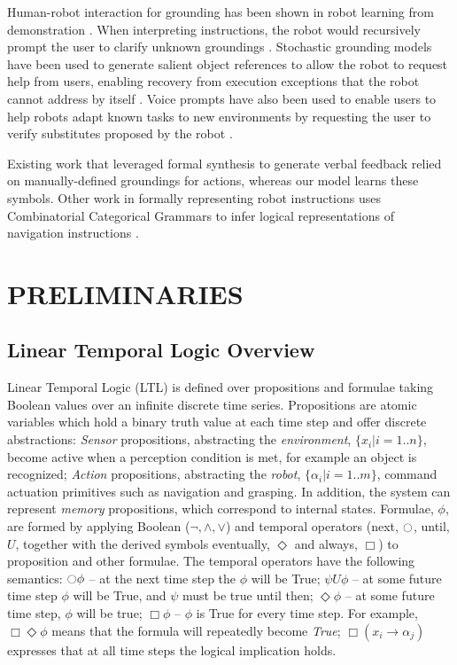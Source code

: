 \documentclass[letterpaper]{article} %
\begin{document}
Human-robot interaction for grounding has been shown in robot learning from demonstration \cite{argall2009survey}. When interpreting instructions, the robot would recursively prompt the user to clarify unknown groundings \cite{lauriar2001training,chao2011towards}. 
Stochastic grounding models have been used to generate salient object references to allow the robot to request help from users, enabling recovery from execution exceptions that the robot cannot address by itself \cite{tellex2014asking}. 
Voice prompts have also been used to enable users to help robots adapt known tasks to new environments by requesting the user to verify substitutes proposed by the robot \cite{boteanu2015towards}.

Existing work that leveraged formal synthesis to generate verbal feedback \cite{raman2013sorry} relied on manually-defined groundings for actions, whereas our model learns these symbols. Other work in formally representing robot instructions uses Combinatorial Categorical Grammars to infer logical representations of navigation instructions \cite{matuszek2013learning}.

\section{PRELIMINARIES}\label{sec:prelim}

\subsection{Linear Temporal Logic Overview}\label{sec:prelim_ltl}
Linear Temporal Logic (LTL) is defined over propositions and formulae taking Boolean values over an infinite discrete time series. Propositions are atomic variables which hold a binary truth value at each time step and offer discrete abstractions: \textit{Sensor} propositions, abstracting the \textit{environment}, $\{x_i | i=1..n\}$, become active when a perception condition is met, for example an object is recognized; \textit{Action} propositions, abstracting the \textit{robot}, $\{\alpha_i | i=1..m\}$, command actuation primitives such as navigation and grasping. In addition, the system can represent \textit{memory} propositions, which correspond to internal states.
Formulae, $\phi$, are formed by applying Boolean ($\neg, \land, \lor$) and temporal operators (next, $\ocircle$, until, $U$, together with the derived symbols eventually, $\Diamond$ and always, $\Box$) to proposition and other formulae. The temporal operators have the following semantics: $\ocircle \phi$ -- at the next time step the $\phi$ will be True; $\psi U \phi$ -- at some future time step $\phi$ will be True, and $\psi$ must be true until then; $\Diamond \phi$ -- at some future time step, $\phi$ will be true; $\Box \phi$ -- $\phi$ is True for every time step.
For example, $\Box \Diamond \phi$ means that the formula will repeatedly become \textit{True}; $\Box ( x_i \to \alpha_j )$ expresses that at all time steps the logical implication holds.
\end{document}
